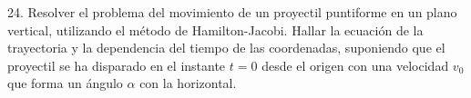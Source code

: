 24. Resolver el problema del movimiento de un proyectil puntiforme en un plano vertical, utilizando el método de Hamilton-Jacobi. Hallar la ecuación de la trayectoria y la dependencia del tiempo de las coordenadas, suponiendo que el proyectil se ha disparado en el instante $t=0$ desde el origen con una velocidad $v_0$ que forma un ángulo $\alpha$ con la horizontal.
